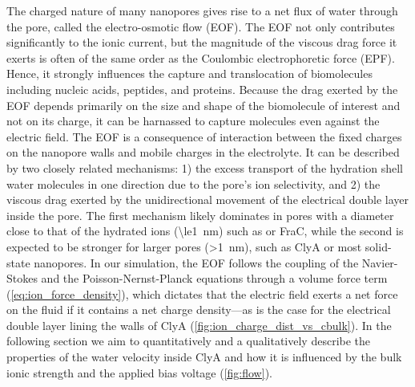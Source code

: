 \documentclass[journal=ancac3,manuscript=article,etalmode=truncate,maxauthors=0,layout=onecolumn]{achemso}
\begin{document}
The charged nature of many nanopores gives rise to a net flux of water through the pore, called the
electro-osmotic flow (EOF).\cite{Qiao-Aluru-2003,Thompson-2003,Mao-2014} The EOF not only contributes
significantly to the ionic current, but the magnitude of the viscous drag force it exerts is often of the same
order as the Coulombic electrophoretic force (EPF). Hence, it strongly influences the capture and
translocation of biomolecules including nucleic acids,\cite{Wong-2007,Luan-2008,Firnkes-2010}
peptides,\cite{Huang-2017,Li-2018,Huang-2019} and
proteins.\cite{Soskine-2012,Soskine-2013,VanMeervelt-2014,Soskine-Biesemans-2015,Biesemans-Soskine-2015,Wloka-2017,Galenkamp-2018,Willems-Ruic-Biesemans-2019}
Because the drag exerted by the EOF depends primarily on the size and shape of the biomolecule of interest and
not on its charge,\cite{Willems-Ruic-Biesemans-2019} it can be harnassed to capture molecules even against the
electric field.\cite{Soskine-2012} The EOF is a consequence of interaction between the fixed charges on the
nanopore walls and mobile charges in the electrolyte. It can be described by two closely related mechanisms:
1) the excess transport of the hydration shell water molecules in one direction due to the pore's ion
selectivity, and 2) the viscous drag exerted by the unidirectional movement of the electrical double layer
inside the pore. The first mechanism likely dominates in pores with a diameter close to that of the hydrated
ions (\SI{\le1}{\nm}) such as \ahl{} or FraC,\cite{Huang-2017,Huang-2019} while the second is expected to be
stronger for larger pores (\SI{>1}{\nm}), such as ClyA\cite{Soskine-2012,Willems-Ruic-Biesemans-2019} or most
solid-state nanopores.\cite{Mao-2014,Laohakunakorn-2015} In our simulation, the EOF follows the coupling of
the Navier-Stokes and the Poisson-Nernst-Planck equations through a volume force term
(\cref{eq:ion_force_density}), which dictates that the electric field exerts a net force on the fluid if it
contains a net charge density---as is the case for the electrical double layer lining the walls of ClyA
(\cref{fig:ion_charge_dist_vs_cbulk}). In the following section we aim to quantitatively and a qualitatively
describe the properties of the water velocity inside ClyA and how it is influenced by the bulk ionic strength
and the applied bias voltage (\cref{fig:flow}).
\end{document}

